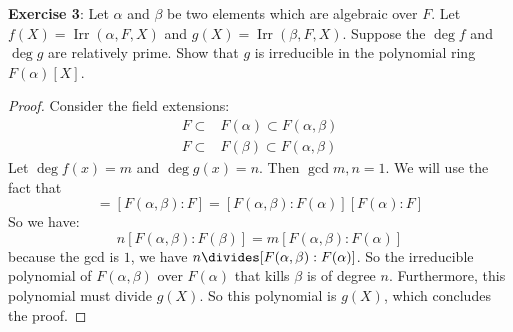\documentclass{article}
\begin{document}
\textbf{Exercise 3}: Let $\alpha$ and $\beta$ be two elements which are algebraic over $F$. Let $f(X) = \mathop{Irr}(\alpha, F, X)$ and $g(X) = \mathop{Irr}( \beta, F, X)$. Suppose the $\deg f$ and $\deg g$ are relatively prime. Show that $g$ is irreducible in the polynomial ring $F(\alpha) [X]$. 
    \begin{proof}
        Consider the field extensions:
            \begin{align*}
                F \subset & F(\alpha)  \subset F(\alpha, \beta) \\
                F \subset & F(\beta)   \subset F(\alpha, \beta)   
            \end{align*}
        Let $\deg f(x) = m$ and $\deg g(x) = n$. Then $\gcd{m, n} = 1$. We will use the fact that
            \begin{equation*}
                [F(\alpha, \beta): F(\beta)] [F(\beta): F] = [F(\alpha, \beta) : F] = [F(\alpha, \beta) : F(\alpha)][F(\alpha) : F] 
            \end{equation*}
        So we have:
            \begin{equation*}
                n[F(\alpha, \beta) : F(\beta)] = m[F(\alpha, \beta): F(\alpha)]
            \end{equation*}
        because the gcd is $1$, we have $n \divides [F(\alpha, \beta): F(\alpha)]$. So the irreducible polynomial of $F(\alpha, \beta)$ over $F(\alpha)$ that kills $\beta$ is of degree $n$. Furthermore, this polynomial must divide $g(X)$. So this polynomial is $g(X)$, which concludes the proof.
    \end{proof}
\end{document}

